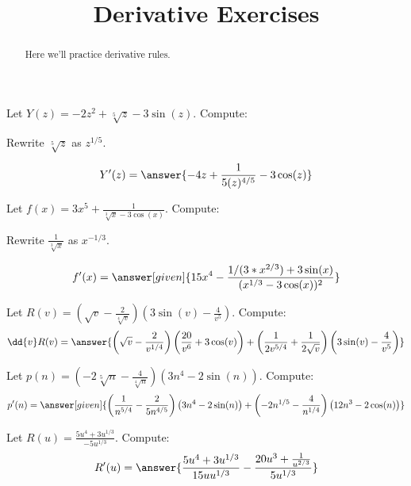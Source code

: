 \documentclass[handout]{ximera}
\title{Derivative Exercises}
\begin{document}
\begin{abstract}
  Here we'll practice derivative rules.
\end{abstract}
\maketitle

\begin{exercise}
Let $Y(z) = -2 z^2 + \sqrt[5]{z} -3 \sin (z)$. Compute:

\begin{hint}
Rewrite $\sqrt[5]{z}$ as $z^{1/5}$.
\end{hint}

\[
Y'(z)
=\answer{-4z+\frac{1}{5 (z)^{4/5}}-3 \cos(z)}
\]
\end{exercise}


\begin{exercise}
Let $f(x) = 3x^5+\frac{1}{\sqrt[3]{x}-3 \cos (x)}$. Compute:

\begin{hint}
Rewrite $\frac{1}{\sqrt[3]{x}}$ as $x^{-1/3}$.
\end{hint}
\[
f'(x)
=\answer[given]{15x^4-\frac{1/(3*x^{2/3}) + 3\sin(x)}{(x^{1/3} - 3\cos(x))^2}}
\]
\end{exercise}

\begin{exercise}
Let $R(v) = \left(\sqrt{v}-\frac{2}{\sqrt[4]{v}}\right) \left(3 \sin (v)-\frac{4}{v^5}\right)$. Compute:
\[
\dd{v}R(v)
=\answer{\left(\sqrt{v}-\frac{2}{{v}^{1/4}}\right) \left(\frac{20}{v^6}+3 \cos (v)\right) + \left(\frac{1}{2 {v}^{5/4}}+\frac{1}{2 \sqrt{v}}\right) \left(3 \sin (v)-\frac{4}{v^5}\right)}
\]
\end{exercise}

\begin{exercise}
Let $p(n) = \left(-2 \sqrt[5]{n}-\frac{4}{\sqrt[4]{n}}\right) \left(3 n^4-2 \sin (n)\right)$. Compute:
\[
p'(n)
=\answer[given]{\left(\frac{1}{{n}^{5/4}}-\frac{2}{5 {n}^{4/5}}\right) \left(3 n^4 - 2 \sin (n)\right)+\left(-2 {n}^{1/5}-\frac{4}{{n}^{1/4}}\right) \left(12 n^3 - 2 \cos (n)\right)}
\]
\end{exercise}

\begin{exercise}
Let $R(u) = \frac{5 u^4+3 {u}^{1/3}}{-5 {u}^{1/3}}$. Compute:
\[
R'(u)
=\answer{\frac{5 u^4 + 3 {u}^{1/3}}{15 u {u}^{1/3}}-\frac{20 u^3+\frac{1}{{u}^{2/3}}}{5 {u}^{1/3}}}
\]
\end{exercise}
\end{document}
